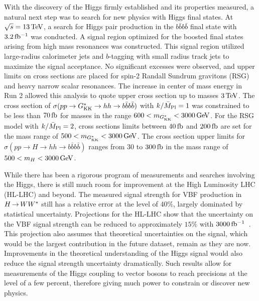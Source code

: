 With the discovery of the Higgs firmly established and its properties measured, a natural next step was to search for new physics with Higgs final states. At $\sqrt{s} = 13 \TeV$, a search for Higgs pair production in the $b\bar{b}b\bar{b}$ final state with $3.2\mbox{\,fb$^{-1}$}$ was conducted. A signal region optimized for the boosted final states arising from high mass resonances was constructed. This signal region utilized large-radius calorimeter jets and $b$-tagging with small radius track jets to maximize the signal acceptance. No significant excesses were observed, and upper limits on cross sections are placed for spin-2 Randall Sundrum gravitons (RSG) and heavy narrow scalar resonances. The increase in center of mass energy in Run 2 allowed this analysis to quote upper cross section up to masses $3 \TeV$. The cross section of $\sigma(pp \to G^*_{\rm KK} \to hh \to b\bar{b}b\bar{b})$ with $k/\bar{M}_{\rm Pl}=1$ was constrained to be less than $70 \mbox{\,fb}$ for masses in the range $600 < m_{\Gkk} < 3000 \GeV$. For the RSG model with $k/\bar{M}_{\rm Pl}=2$, cross sections limits between $40\mbox{\,fb}$ and $200 \mbox{\,fb}$ are set for the mass range of $500 < m_{\Gkk} < 3000 \GeV$. The cross section upper limits for $\sigma(pp \to H \to hh \to b\bar{b}b\bar{b})$ ranges from $30$ to $300 \mbox{\,fb}$ in the mass range of $500 < m_{H} < 3000 \GeV$. 

While there has been a rigorous program of measurements and searches involving the Higgs, there is still much room for improvement at the High Luminosity LHC (HL-LHC) and beyond. The measured signal strength for VBF production in $H{\,{\rightarrow}\,}WW^\ast$ still has a relative error at the level of $40\%$, largely dominated by statistical uncertainty. Projections for the HL-LHC show that the uncertainty on the VBF signal strength can be reduced to approximately $15\%$ with $3000 \mbox{\,fb$^{-1}$}$~\cite{HiggsProj,ScopingDocument}. This projection also assumes that theoretical uncertainties on the signal, which would be the largest contribution in the future dataset, remain as they are now. Improvements in the theoretical understanding of the Higgs signal would also reduce the signal strength uncertainty dramatically. Such results allow for measurements of the Higgs coupling to vector bosons to reach precisions at the level of a few percent, therefore giving much power to constrain or discover new physics. 

